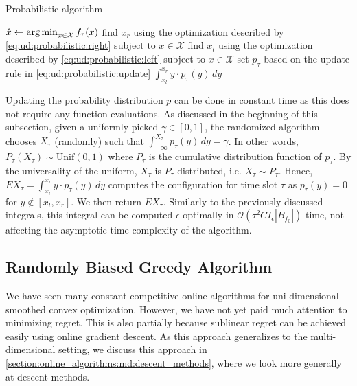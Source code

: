 \begin{algorithm}
    \caption{Probabilistic algorithm~\cite{Bansal2015}}\label{alg:ud:probabilistic}
    $\hat{x} \gets \operatorname*{arg\,min}_{x \in \mathcal{X}} f_{\tau}(x)$\;
    find $x_r$ using the optimization described by \cref{eq:ud:probabilistic:right} subject to $x \in \mathcal{X}$\;
    find $x_l$ using the optimization described by \cref{eq:ud:probabilistic:left} subject to $x \in \mathcal{X}$\;
    set $p_{\tau}$ based on the update rule in \cref{eq:ud:probabilistic:update}\;
    \Return $\int_{x_l}^{x_r} y \cdot p_{\tau}(y) \,dy$\;
\end{algorithm}

Updating the probability distribution $p$ can be done in constant time as this does not require any function evaluations. As discussed in the beginning of this subsection, given a uniformly picked $\gamma \in [0,1]$, the randomized algorithm chooses $X_{\tau}$ (randomly) such that $\int_{-\infty}^{X_{\tau}} p_{\tau}(y) \,dy = \gamma$. In other words, $P_{\tau}(X_{\tau}) \sim \text{Unif}(0,1)$ where $P_{\tau}$ is the cumulative distribution function of $p_{\tau}$. By the universality of the uniform, $X_{\tau}$ is $P_{\tau}$-distributed, i.e. $X_{\tau} \sim P_{\tau}$. Hence, $E X_{\tau} = \int_{x_l}^{x_r} y \cdot p_{\tau}(y) \,dy$ computes the configuration for time slot $\tau$ as $p_{\tau}(y) = 0$ for $y \not\in [x_l, x_r]$. We then return $E X_{\tau}$. Similarly to the previously discussed integrals, this integral can be computed $\epsilon$-optimally in $\mathcal{O}(\tau^2 C I_{\epsilon} |B_{f_0}|)$ time, not affecting the asymptotic time complexity of the algorithm.

\subsection{Randomly Biased Greedy Algorithm}\label{section:online_algorithms:ud:rbg}

We have seen many constant-competitive online algorithms for uni-dimensional smoothed convex optimization. However, we have not yet paid much attention to minimizing regret. This is also partially because sublinear regret can be achieved easily using online gradient descent. As this approach generalizes to the multi-dimensional setting, we discuss this approach in \cref{section:online_algorithms:md:descent_methods}, where we look more generally at descent methods.

